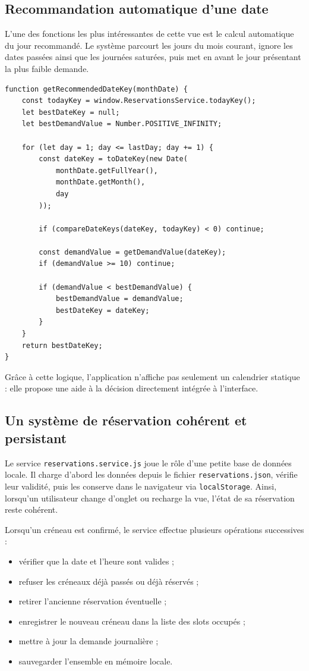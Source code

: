 \documentclass[12pt,a4paper]{article}
\begin{document}
\subsection*{Recommandation automatique d'une date}
L'une des fonctions les plus intéressantes de cette vue est le calcul automatique du jour recommandé. Le système parcourt les jours du mois courant, ignore les dates passées ainsi que les journées saturées, puis met en avant le jour présentant la plus faible demande.

\begin{lstlisting}[caption={Extrait simplifie de la logique de recommandation}]
function getRecommendedDateKey(monthDate) {
    const todayKey = window.ReservationsService.todayKey();
    let bestDateKey = null;
    let bestDemandValue = Number.POSITIVE_INFINITY;

    for (let day = 1; day <= lastDay; day += 1) {
        const dateKey = toDateKey(new Date(
            monthDate.getFullYear(),
            monthDate.getMonth(),
            day
        ));

        if (compareDateKeys(dateKey, todayKey) < 0) continue;

        const demandValue = getDemandValue(dateKey);
        if (demandValue >= 10) continue;

        if (demandValue < bestDemandValue) {
            bestDemandValue = demandValue;
            bestDateKey = dateKey;
        }
    }
    return bestDateKey;
}
\end{lstlisting}

Grâce à cette logique, l'application n'affiche pas seulement un calendrier statique : elle propose une aide à la décision directement intégrée à l'interface.

\subsection*{Un système de réservation cohérent et persistant}
Le service \texttt{reservations.service.js} joue le rôle d'une petite base de données locale. Il charge d'abord les données depuis le fichier \texttt{reservations.json}, vérifie leur validité, puis les conserve dans le navigateur via \texttt{localStorage}. Ainsi, lorsqu'un utilisateur change d'onglet ou recharge la vue, l'état de sa réservation reste cohérent.

Lorsqu'un créneau est confirmé, le service effectue plusieurs opérations successives :
\begin{itemize}
    \item vérifier que la date et l'heure sont valides ;
    \item refuser les créneaux déjà passés ou déjà réservés ;
    \item retirer l'ancienne réservation éventuelle ;
    \item enregistrer le nouveau créneau dans la liste des slots occupés ;
    \item mettre à jour la demande journalière ;
    \item sauvegarder l'ensemble en mémoire locale.
\end{itemize}
\end{document}
